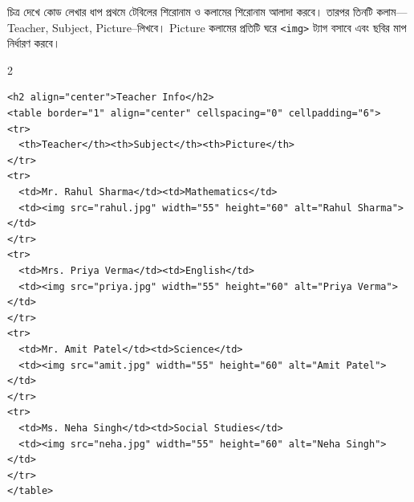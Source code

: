 \begin{minipage}[t]{\linewidth}
\begin{minipage}[t]{.52\linewidth}
\begin{keypointbox}{চিত্র দেখে কোড লেখার ধাপ}
প্রথমে টেবিলের শিরোনাম ও কলামের শিরোনাম আলাদা করবে। তারপর তিনটি কলাম—Teacher, Subject, Picture--লিখবে। Picture কলামের প্রতিটি ঘরে \texttt{<img>} ট্যাগ বসাবে এবং ছবির মাপ নির্ধারণ করবে।
\end{keypointbox}
\end{minipage}
\par\smallskip
\end{minipage}\par\smallskip
{}
\par{}\par\smallskip
\begin{multicols}{2}
\begin{verbatim}
<h2 align="center">Teacher Info</h2>
<table border="1" align="center" cellspacing="0" cellpadding="6">
<tr>
  <th>Teacher</th><th>Subject</th><th>Picture</th>
</tr>
<tr>
  <td>Mr. Rahul Sharma</td><td>Mathematics</td>
  <td><img src="rahul.jpg" width="55" height="60" alt="Rahul Sharma"></td>
</tr>
<tr>
  <td>Mrs. Priya Verma</td><td>English</td>
  <td><img src="priya.jpg" width="55" height="60" alt="Priya Verma"></td>
</tr>
<tr>
  <td>Mr. Amit Patel</td><td>Science</td>
  <td><img src="amit.jpg" width="55" height="60" alt="Amit Patel"></td>
</tr>
<tr>
  <td>Ms. Neha Singh</td><td>Social Studies</td>
  <td><img src="neha.jpg" width="55" height="60" alt="Neha Singh"></td>
</tr>
</table>
\end{verbatim}
\end{multicols}
\smallskip


